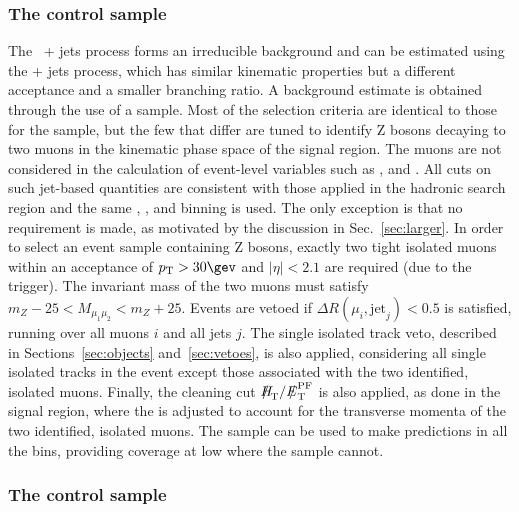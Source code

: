 \subsubsection{The \texorpdfstring{\mmj}{di-muon plus jets} control sample}

The \znunu\ + jets process forms an irreducible background and can be
estimated using the \zmumu + jets process, which has similar kinematic
properties but a different acceptance and a smaller branching ratio. A
background estimate is obtained through the use of a \mmj sample. Most
of the selection criteria are identical to those for the \mj sample,
but the few that differ are tuned to identify Z bosons decaying to two
muons in the kinematic phase space of the signal region. The muons are
not considered in the calculation of event-level variables such as
\scalht, \mht and \alphat. All cuts on such jet-based quantities are
consistent with those applied in the hadronic search region and the
same \njet, \nb, and \scalht binning is used. The only exception is
that no \alphat requirement is made, as motivated by the discussion in
Sec.~\ref{sec:larger}. In order to select an event sample containing Z
bosons, exactly two tight isolated muons within an acceptance of $\Pt
> 30\gev$ and $|\eta| < 2.1$ are required (due to the trigger). The
invariant mass of the two muons must satisfy $m_{Z} - 25 <
M_{\mu_1\mu_2} < m_{Z} + 25$. Events are vetoed if $\Delta
R(\mu_{i},\textrm{jet}_j) < 0.5$ is satisfied, running over all muons
$i$ and all jets $j$. The single isolated track veto, described in
Sections~\ref{sec:objects} and~\ref{sec:vetoes}, is also
applied, considering all single isolated tracks in the event except
those associated with the two identified, isolated muons. Finally, the
cleaning cut $\mht/\pfmet$ is also applied, as done in the signal
region, where the \pfmet is adjusted to account for the transverse
momenta of the two identified, isolated muons. The \mmj sample can be
used to make predictions in all the \scalht bins, providing coverage
at low \scalht where the \gj sample cannot.

\subsubsection{The \texorpdfstring{\gj}{photon plus jets} control sample}
\label{sec:photoncontrolSelection}

